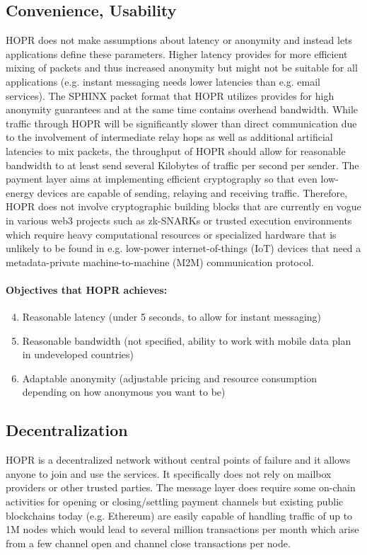 \documentclass{article}
\begin{document}
\subsection{Convenience, Usability}
HOPR does not make assumptions about latency or anonymity and instead lets applications define these parameters. Higher latency provides for more efficient mixing of packets and thus increased anonymity but might not be suitable for all applications (e.g. instant messaging needs lower latencies than e.g. email services). The SPHINX packet format that HOPR utilizes provides for high anonymity guarantees and at the same time contains overhead bandwidth. While traffic through HOPR will be significantly slower than direct communication due to the involvement of intermediate relay hops as well as additional artificial latencies to mix packets, the throughput of HOPR should allow for reasonable bandwidth to at least send several Kilobytes of traffic per second per sender. The payment layer aims at implementing efficient cryptography so that even low-energy devices are capable of sending, relaying and receiving traffic. Therefore, HOPR does not involve cryptographic building blocks that are currently en vogue in various web3 projects such as zk-SNARKs or trusted execution environments which require heavy computational resources or specialized hardware that is unlikely to be found in e.g. low-power internet-of-things (IoT) devices that need a metadata-private machine-to-machine (M2M) communication protocol. 

\paragraph{Objectives that HOPR achieves:}

\begin{enumerate}\setcounter{enumi}{3}
    \item Reasonable latency (under 5 seconds, to allow for instant messaging)
    \item Reasonable bandwidth (not specified, ability to work with mobile data plan in undeveloped countries)
    \item Adaptable anonymity (adjustable pricing and resource consumption depending on how anonymous you want to be)
\end{enumerate}

\subsection{Decentralization}
HOPR is a decentralized network without central points of failure and it allows anyone to join and use the services. It specifically does not rely on mailbox providers or other trusted parties. The message layer does require some on-chain activities for opening or closing/settling payment channels but existing public blockchains today (e.g. Ethereum) are easily capable of handling traffic of up to 1M nodes which would lead to several million transactions per month which arise from a few channel open and channel close transactions per node.
\end{document}
